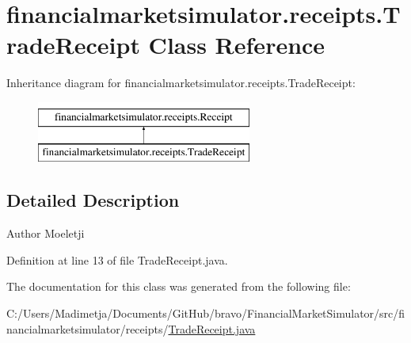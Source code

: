 \hypertarget{classfinancialmarketsimulator_1_1receipts_1_1_trade_receipt}{\section{financialmarketsimulator.\+receipts.\+Trade\+Receipt Class Reference}
\label{classfinancialmarketsimulator_1_1receipts_1_1_trade_receipt}
}
Inheritance diagram for financialmarketsimulator.\+receipts.\+Trade\+Receipt\+:\begin{figure}[H]
\begin{center}
\leavevmode
\includegraphics[height=2.000000cm]{classfinancialmarketsimulator_1_1receipts_1_1_trade_receipt}
\end{center}
\end{figure}


\subsection{Detailed Description}
\begin{DoxyAuthor}{Author}
Moeletji 
\end{DoxyAuthor}


Definition at line 13 of file Trade\+Receipt.\+java.



The documentation for this class was generated from the following file\+:\begin{DoxyCompactItemize}
\item 
C\+:/\+Users/\+Madimetja/\+Documents/\+Git\+Hub/bravo/\+Financial\+Market\+Simulator/src/financialmarketsimulator/receipts/\hyperlink{_trade_receipt_8java}{Trade\+Receipt.\+java}\end{DoxyCompactItemize}
